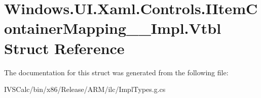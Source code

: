\hypertarget{struct_windows_1_1_u_i_1_1_xaml_1_1_controls_1_1_i_item_container_mapping_____impl_1_1_vtbl}{}\section{Windows.\+U\+I.\+Xaml.\+Controls.\+I\+Item\+Container\+Mapping\+\_\+\+\_\+\+Impl.\+Vtbl Struct Reference}
\label{struct_windows_1_1_u_i_1_1_xaml_1_1_controls_1_1_i_item_container_mapping_____impl_1_1_vtbl}


The documentation for this struct was generated from the following file\+:\begin{DoxyCompactItemize}
\item 
I\+V\+S\+Calc/bin/x86/\+Release/\+A\+R\+M/ilc/Impl\+Types.\+g.\+cs\end{DoxyCompactItemize}
